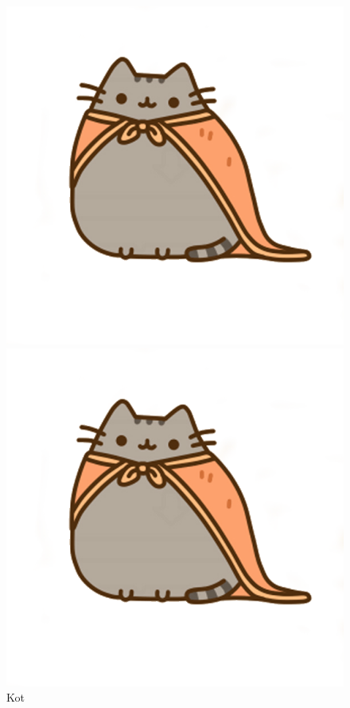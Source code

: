 \documentclass{article}
\begin{document}
\begin{figure}
	\includegraphics[width=\linewidth]{cat.png}
	\caption{Kot}
	\endminipage\hfill
	\includegraphics[width=\linewidth]{cat.png}

\end{figure}
\end{document}
